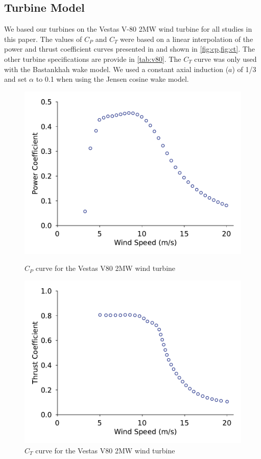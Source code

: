 \documentclass[journal abbreviation, manuscript]{copernicus}
\begin{document}
	\subsection{Turbine Model}
	We based our turbines on the Vestas V-80 2MW wind turbine for all studies in this paper. The values of $C_P$ and $C_T$ were based on a linear interpolation of the power and thrust coefficient curves presented in \cite{niayifar2016} and shown in \ref{fig:cp,fig:ct}. The other turbine specifications are provide in \ref{tab:v80}. The $C_T$ curve was only used with the Bastankhah wake model. We used a constant axial induction ($a$) of 1/3 and set $\alpha$ to 0.1 when using the Jensen cosine wake model.
	\begin{figure}[h!]
		\centering
		\begin{minipage}[t]{0.48\textwidth}
			\centering
			\includegraphics[width=\textwidth, trim={0cm 0cm 0cm 0cm}, clip]{inputs/cp_curve_v80}
			\caption{$C_P$ curve for the Vestas V80 2MW wind turbine \cite{niayifar2016} }
			\label{fig:cp}
		\end{minipage}\hspace{1pc}%
		\begin{minipage}[t]{0.48\textwidth}
			\centering
			\includegraphics[width=\textwidth]{inputs/ct_curve_v80.pdf}
			\caption{$C_T$ curve for the Vestas V80 2MW wind turbine \cite{niayifar2016}}
			\label{fig:ct}
		\end{minipage} 
	\end{figure}
\end{document}
